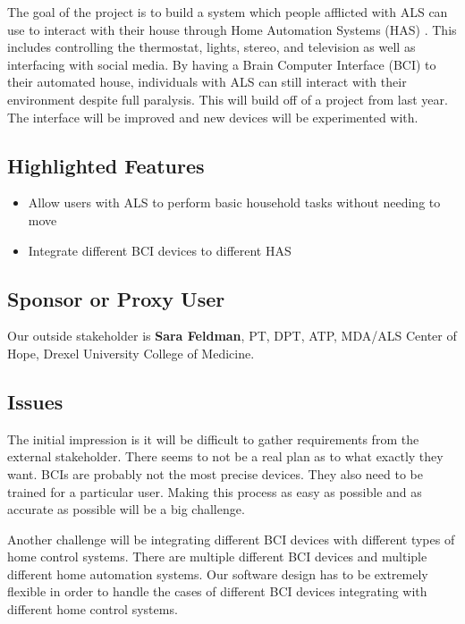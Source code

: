 \documentclass{report}
\begin{document}

The goal of the project is to build a system which people afflicted with ALS can use to interact with their house through Home Automation Systems (HAS) . This includes controlling the thermostat, lights, stereo, and television as well as interfacing with social media. By having a Brain Computer Interface (BCI) to their automated house, individuals with ALS can still interact with their environment despite full paralysis. This will build off of a project from last year. The interface will be improved and new devices will be experimented with.  

\subsection*{Highlighted Features}

\begin{itemize}
\item Allow users with ALS to perform basic household tasks without needing to move
\item Integrate different BCI devices to different HAS
\end{itemize}

\subsection*{Sponsor or Proxy User}

Our outside stakeholder is \textbf{Sara Feldman}, PT, DPT, ATP, MDA/ALS Center
of Hope, Drexel University College of Medicine.


\subsection*{Issues}

The initial impression is it will be difficult to gather requirements from the external stakeholder. There seems to not be a real plan as to what exactly they want. 
BCIs are probably not the most precise devices. They also need to be trained for a particular user. Making this process as easy as possible and as accurate as possible will be a big challenge.

Another challenge will be integrating different BCI devices with different types of home control systems. There are multiple different BCI devices and multiple different home automation systems. Our software design has to be extremely flexible in order to handle the cases of different BCI devices integrating with different home control systems. 
\end{document}

